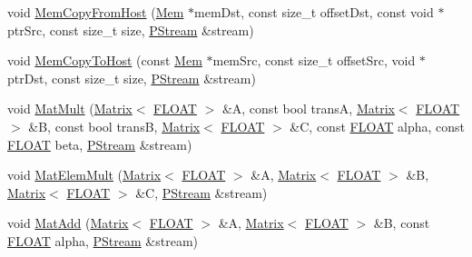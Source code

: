\begin{DoxyCompactItemize}
\item 
void \hyperlink{classfractal_1_1Engine_a71cd485bef6bde65f3b372e130eeb32b}{Mem\+Copy\+From\+Host} (\hyperlink{classfractal_1_1Mem}{Mem} $\ast$mem\+Dst, const size\+\_\+t offset\+Dst, const void $\ast$ptr\+Src, const size\+\_\+t size, \hyperlink{classfractal_1_1PStream}{P\+Stream} \&stream)
\item 
void \hyperlink{classfractal_1_1Engine_addf726a73831cdc0408294811ba93b34}{Mem\+Copy\+To\+Host} (const \hyperlink{classfractal_1_1Mem}{Mem} $\ast$mem\+Src, const size\+\_\+t offset\+Src, void $\ast$ptr\+Dst, const size\+\_\+t size, \hyperlink{classfractal_1_1PStream}{P\+Stream} \&stream)
\item 
void \hyperlink{classfractal_1_1Engine_a8c5528c801c14c37268ec3dad8596ab6}{Mat\+Mult} (\hyperlink{classfractal_1_1Matrix}{Matrix}$<$ \hyperlink{namespacefractal_a1c2d2530689575d5ccb56bae52af70d3}{F\+L\+O\+A\+T} $>$ \&A, const bool trans\+A, \hyperlink{classfractal_1_1Matrix}{Matrix}$<$ \hyperlink{namespacefractal_a1c2d2530689575d5ccb56bae52af70d3}{F\+L\+O\+A\+T} $>$ \&B, const bool trans\+B, \hyperlink{classfractal_1_1Matrix}{Matrix}$<$ \hyperlink{namespacefractal_a1c2d2530689575d5ccb56bae52af70d3}{F\+L\+O\+A\+T} $>$ \&C, const \hyperlink{namespacefractal_a1c2d2530689575d5ccb56bae52af70d3}{F\+L\+O\+A\+T} alpha, const \hyperlink{namespacefractal_a1c2d2530689575d5ccb56bae52af70d3}{F\+L\+O\+A\+T} beta, \hyperlink{classfractal_1_1PStream}{P\+Stream} \&stream)
\item 
void \hyperlink{classfractal_1_1Engine_aa04b3c6a637a15d41a39b7a173ca68e3}{Mat\+Elem\+Mult} (\hyperlink{classfractal_1_1Matrix}{Matrix}$<$ \hyperlink{namespacefractal_a1c2d2530689575d5ccb56bae52af70d3}{F\+L\+O\+A\+T} $>$ \&A, \hyperlink{classfractal_1_1Matrix}{Matrix}$<$ \hyperlink{namespacefractal_a1c2d2530689575d5ccb56bae52af70d3}{F\+L\+O\+A\+T} $>$ \&B, \hyperlink{classfractal_1_1Matrix}{Matrix}$<$ \hyperlink{namespacefractal_a1c2d2530689575d5ccb56bae52af70d3}{F\+L\+O\+A\+T} $>$ \&C, \hyperlink{classfractal_1_1PStream}{P\+Stream} \&stream)
\item 
void \hyperlink{classfractal_1_1Engine_a59291485d88c87ef48d07b08ec72876d}{Mat\+Add} (\hyperlink{classfractal_1_1Matrix}{Matrix}$<$ \hyperlink{namespacefractal_a1c2d2530689575d5ccb56bae52af70d3}{F\+L\+O\+A\+T} $>$ \&A, \hyperlink{classfractal_1_1Matrix}{Matrix}$<$ \hyperlink{namespacefractal_a1c2d2530689575d5ccb56bae52af70d3}{F\+L\+O\+A\+T} $>$ \&B, const \hyperlink{namespacefractal_a1c2d2530689575d5ccb56bae52af70d3}{F\+L\+O\+A\+T} alpha, \hyperlink{classfractal_1_1PStream}{P\+Stream} \&stream)

\end{DoxyCompactItemize}
